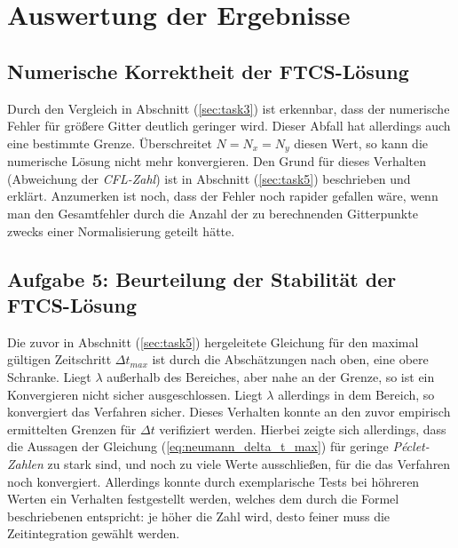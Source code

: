 \documentclass[12pt,a4paper,titlepage,headinclude,bibtotoc]{scrartcl}
\begin{document}
\hfill%

\section{Auswertung der Ergebnisse}
\label{sec:interpretation}
\subsection{Numerische Korrektheit der FTCS-Lösung}
\label{sec:disc_num_corr}
Durch den Vergleich in Abschnitt (\ref{sec:task3}) ist erkennbar, dass der numerische Fehler für größere Gitter deutlich geringer wird. Dieser Abfall hat allerdings auch eine bestimmte Grenze. Überschreitet $N = N_x = N_y$ diesen Wert, so kann die numerische Lösung nicht mehr konvergieren. Den Grund für dieses Verhalten (Abweichung der \textit{CFL-Zahl}) ist in Abschnitt (\ref{sec:task5}) beschrieben und erklärt. Anzumerken ist noch, dass der Fehler noch rapider gefallen wäre, wenn man den Gesamtfehler durch die Anzahl der zu berechnenden Gitterpunkte zwecks einer Normalisierung geteilt hätte.

\subsection{Aufgabe 5: Beurteilung der Stabilität der FTCS-Lösung}
\label{sec:disc_stability}
Die zuvor in Abschnitt (\ref{sec:task5}) hergeleitete Gleichung für den maximal gültigen Zeitschritt $\Delta t_{max}$ ist durch die Abschätzungen nach oben, eine obere Schranke. Liegt $\lambda$ außerhalb des Bereiches, aber nahe an der Grenze, so ist ein Konvergieren nicht sicher ausgeschlossen. Liegt $\lambda$ allerdings in dem Bereich, so konvergiert das Verfahren sicher. Dieses Verhalten konnte an den zuvor empirisch ermittelten Grenzen für $\Delta t$ verifiziert werden. Hierbei zeigte sich allerdings, dass die Aussagen der Gleichung (\ref{eq:neumann_delta_t_max}) für geringe \textit{Péclet-Zahlen} zu stark sind, und noch zu viele Werte ausschließen, für die das Verfahren noch konvergiert. Allerdings konnte durch exemplarische Tests bei höhreren Werten ein Verhalten festgestellt werden, welches dem durch die Formel beschriebenen entspricht: je höher die Zahl wird, desto feiner muss die Zeitintegration gewählt werden.
\end{document}
